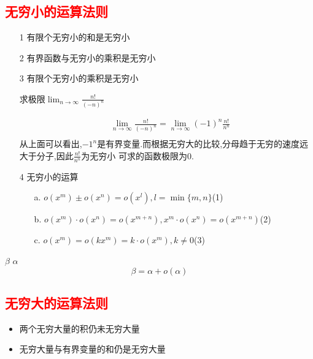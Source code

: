 \documentclass[12pt, a4paper, oneside, UTF8]{ctexbook}  %
\begin{document}
\begin{sloppypar}
    \subsection{\textcolor{red}{无穷小的运算法则}}
    \begin{itemize}
        \item[1] 有限个无穷小的和是无穷小
        \item[2] 有界函数与无穷小的乘积是无穷小
        \item[3] 有限个无穷小的乘积是无穷小
            \begin{problem}
            求极限$\lim _{n \to \infty} \frac{n!}{(-n)^n}$
            \end{problem}
            \begin{solution}
                \begin{align*}
                     & \lim _{n \to \infty} \frac{n!}{(-n)^n}=\lim_{n \to \infty} (-1)^n \frac{n!}{n^n} \\
                \end{align*}
                从上面可以看出,$-1^n$是有界变量.而根据无穷大的比较,分母趋于无穷的速度远大于分子,因此$\frac{n!}{n^n}为无穷小$
                可求的函数极限为0.
            \end{solution}
        \item[4] 无穷小的运算
            \begin{itemize}
                \item[a.] $o(x^m)\pm o(x^n)=o(x^l),l=\min\{ m,n\}$(1)
                \item[b.] $o(x^m)\cdot o(x^n)=o(x^{m+n}),x^m \cdot o(x^n)=o(x^{m+n})$(2)
                \item[c.] $o(x^m)=o(kx^m)=k\cdot o(x^m),k \neq 0$(3)
            \end{itemize}
    \end{itemize}
    \begin{them}{}{}
        $\beta$ $\alpha$ 
        $$
            \beta =\alpha +o(\alpha)
        $$
    \end{them}
    \subsection{\textcolor{red}{无穷大的运算法则}}
    \begin{itemize}
        \item 两个无穷大量的积仍未无穷大量
        \item 无穷大量与有界变量的和仍是无穷大量
    \end{itemize}


\end{sloppypar}
\end{document}
